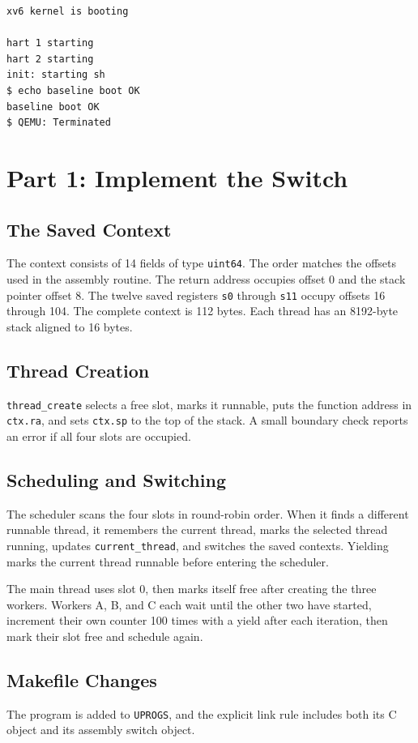 \documentclass[12pt,a4paper]{article}
\begin{document}
\begin{lstlisting}[caption={Baseline QEMU boot and shell check}]
xv6 kernel is booting

hart 1 starting
hart 2 starting
init: starting sh
$ echo baseline boot OK
baseline boot OK
$ QEMU: Terminated
\end{lstlisting}

\section{Part 1: Implement the Switch}
\subsection{The Saved Context}
The context consists of 14 fields of type \texttt{uint64}. The order matches the
offsets used in the assembly routine. The return address occupies offset 0 and
the stack pointer offset 8. The twelve saved registers \texttt{s0} through
\texttt{s11} occupy offsets 16 through 104. The complete context is 112 bytes.
Each thread has an 8192-byte stack aligned to 16 bytes.

\subsection{Thread Creation}
\texttt{thread\_create} selects a free slot, marks it runnable, puts the function
address in \texttt{ctx.ra}, and sets \texttt{ctx.sp} to the top of the stack.
A small boundary check reports an error if all four slots are occupied.

\subsection{Scheduling and Switching}
The scheduler scans the four slots in round-robin order. When it finds a different
runnable thread, it remembers the current thread, marks the selected thread
running, updates \texttt{current\_thread}, and switches the saved contexts.
Yielding marks the current thread runnable before entering the scheduler.

The main thread uses slot 0, then marks itself free after creating the three
workers. Workers A, B, and C each wait until the other two have started, increment
their own counter 100 times with a yield after each iteration, then mark their
slot free and schedule again.

\subsection{Makefile Changes}
The program is added to \texttt{UPROGS}, and the explicit link rule includes both
its C object and its assembly switch object.
\end{document}
